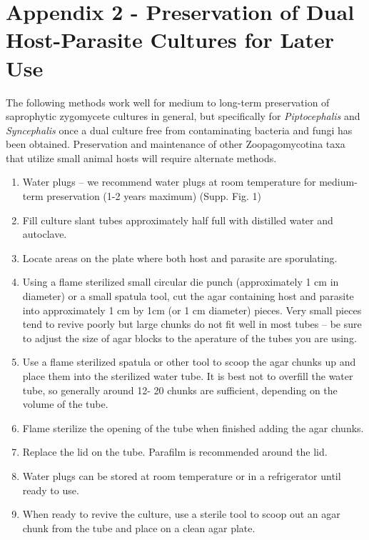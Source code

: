 \documentclass[]{book}
\begin{document}
\section{Appendix 2 - Preservation of Dual Host-Parasite Cultures for
Later
Use}\label{appendix-2---preservation-of-dual-host-parasite-cultures-for-later-use}

The following methods work well for medium to long-term preservation of
saprophytic zygomycete cultures in general, but specifically for
\emph{Piptocephalis} and \emph{Syncephalis} once a dual culture free
from contaminating bacteria and fungi has been obtained. Preservation
and maintenance of other Zoopagomycotina taxa that utilize small animal
hosts will require alternate methods.

\begin{enumerate}
\def\labelenumi{\arabic{enumi}.}
\item
  {Water plugs -- we recommend water plugs at room temperature for
  medium-term preservation (1-2 years maximum) (Supp. Fig. 1)}
\item
  Fill culture slant tubes approximately half full with distilled water
  and autoclave.
\item
  Locate areas on the plate where both host and parasite are
  sporulating.
\item
  Using a flame sterilized small circular die punch (approximately 1 cm
  in diameter) or a small spatula tool, cut the agar containing host and
  parasite into approximately 1 cm by 1cm (or 1 cm diameter) pieces.
  Very small pieces tend to revive poorly but large chunks do not fit
  well in most tubes -- be sure to adjust the size of agar blocks to the
  aperature of the tubes you are using.
\item
  Use a flame sterilized spatula or other tool to scoop the agar chunks
  up and place them into the sterilized water tube. It is best not to
  overfill the water tube, so generally around 12- 20 chunks are
  sufficient, depending on the volume of the tube.
\item
  Flame sterilize the opening of the tube when finished adding the agar
  chunks.
\item
  Replace the lid on the tube. Parafilm is recommended around the lid.
\item
  Water plugs can be stored at room temperature or in a refrigerator
  until ready to use.
\item
  When ready to revive the culture, use a sterile tool to scoop out an
  agar chunk from the tube and place on a clean agar plate.

\end{enumerate}
\end{document}

